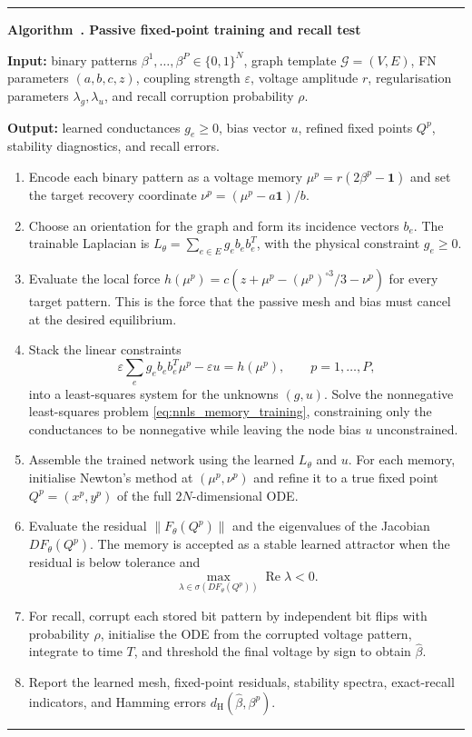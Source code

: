 \documentclass[11pt]{article}
\newcounter{algorithm}
\newenvironment{paperalgorithm}[1]{%
  \refstepcounter{algorithm}%
  \par\medskip
  \noindent\hrule
  \vspace{0.45em}
  \noindent\textbf{Algorithm~\thealgorithm. #1}\par\vspace{0.35em}
}{%
  \vspace{0.35em}
  \noindent\hrule
  \par\medskip
}
\begin{document}
\begin{paperalgorithm}{Passive fixed-point training and recall test}
\label{alg:passive_fixed_point_training}
\textbf{Input:} binary patterns
$\beta^1,\ldots,\beta^P\in\{0,1\}^N$, graph template
$\mathcal{G}=(V,E)$, FN parameters $(a,b,c,z)$, coupling strength
$\varepsilon$, voltage amplitude $r$, regularisation parameters
$\lambda_g,\lambda_u$, and recall corruption probability $\rho$.

\textbf{Output:} learned conductances $g_e\geq 0$, bias vector $u$,
refined fixed points $Q^p$, stability diagnostics, and recall errors.

\begin{enumerate}
  \item Encode each binary pattern as a voltage memory
  $\mu^p=r(2\beta^p-\mathbf{1})$ and set the target recovery coordinate
  $\nu^p=(\mu^p-a\mathbf{1})/b$.

  \item Choose an orientation for the graph and form its incidence
  vectors $b_e$.  The trainable Laplacian is
  $L_\theta=\sum_{e\in E}g_e b_e b_e^T$, with the physical constraint
  $g_e\geq 0$.

  \item Evaluate the local force
  $h(\mu^p)=c(z+\mu^p-(\mu^p)^{\circ 3}/3-\nu^p)$ for every target
  pattern.  This is the force that the passive mesh and bias must
  cancel at the desired equilibrium.

  \item Stack the linear constraints
  \[
    \varepsilon\sum_e g_e b_e b_e^T\mu^p-\varepsilon u=h(\mu^p),
    \qquad p=1,\ldots,P,
  \]
  into a least-squares system for the unknowns $(g,u)$.  Solve the
  nonnegative least-squares problem \eqref{eq:nnls_memory_training},
  constraining only the conductances to be nonnegative while leaving
  the node bias $u$ unconstrained.

  \item Assemble the trained network using the learned
  $L_\theta$ and $u$.  For each memory, initialise Newton's method at
  $(\mu^p,\nu^p)$ and refine it to a true fixed point
  $Q^p=(x^p,y^p)$ of the full $2N$-dimensional ODE.

  \item Evaluate the residual $\|F_\theta(Q^p)\|$ and the eigenvalues
  of the Jacobian $DF_\theta(Q^p)$.  The memory is accepted as a stable
  learned attractor when the residual is below tolerance and
  \[
    \max_{\lambda\in\sigma(DF_\theta(Q^p))}
    \operatorname{Re}\lambda<0.
  \]

  \item For recall, corrupt each stored bit pattern by independent bit
  flips with probability $\rho$, initialise the ODE from the corrupted
  voltage pattern, integrate to time $T$, and threshold the final
  voltage by sign to obtain $\widehat\beta$.

  \item Report the learned mesh, fixed-point residuals, stability
  spectra, exact-recall indicators, and Hamming errors
  $d_{\mathrm H}(\widehat\beta,\beta^p)$.
\end{enumerate}
\end{paperalgorithm}
\end{document}
